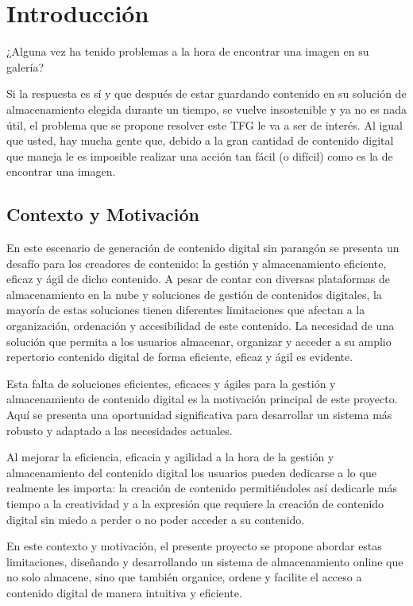 \chapter{Introducción}

¿Alguna vez ha tenido problemas a la hora de encontrar una imagen en su galería?

Si la respuesta es sí y que después de estar guardando contenido en su solución de almacenamiento elegida durante un tiempo, se vuelve insostenible y ya no es nada útil, el problema que se propone resolver este TFG le va a ser de interés. Al igual que usted, hay mucha gente que, debido a la gran cantidad de contenido digital que maneja le es imposible realizar una acción tan fácil (o difícil) como es la de encontrar una imagen.

\section{Contexto y Motivación}

En este escenario de generación de contenido digital sin parangón se presenta un desafío para los creadores de contenido: la gestión y almacenamiento eficiente, eficaz
y ágil de dicho contenido. A pesar de contar con diversas plataformas de almacenamiento en la nube y soluciones de gestión de contenidos digitales, la mayoría de
estas soluciones tienen diferentes limitaciones que afectan a la organización, ordenación y accesibilidad de este contenido. La necesidad de una solución que permita
a los usuarios almacenar, organizar y acceder a su amplio repertorio contenido digital de forma eficiente, eficaz y ágil es evidente.

Esta falta de soluciones eficientes, eficaces y ágiles para la gestión y almacenamiento de contenido digital es la motivación principal de este proyecto. Aquí se
presenta una oportunidad significativa para desarrollar un sistema más robusto y adaptado a las necesidades actuales.

Al mejorar la eficiencia, eficacia y agilidad a la hora de la gestión y almacenamiento del contenido digital los usuarios pueden dedicarse a lo que realmente les importa:
la creación de contenido permitiéndoles así dedicarle más tiempo a la creatividad y a la expresión que requiere la creación de contenido digital sin miedo a perder o
no poder acceder a su contenido.

En este contexto y motivación, el presente proyecto se propone abordar estas limitaciones, diseñando y desarrollando un sistema de almacenamiento online que no solo almacene, 
sino que también organice, ordene y facilite el acceso a contenido digital de manera intuitiva y eficiente.

